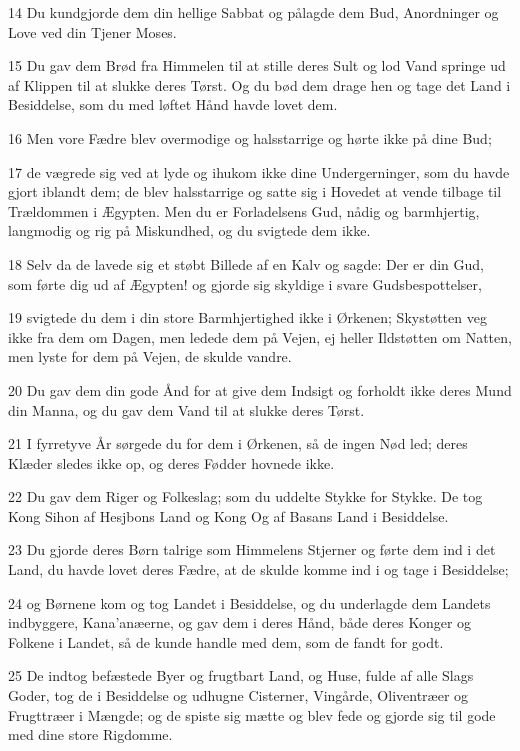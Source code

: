 \par 14 Du kundgjorde dem din hellige Sabbat og pålagde dem Bud, Anordninger og Love ved din Tjener Moses.
\par 15 Du gav dem Brød fra Himmelen til at stille deres Sult og lod Vand springe ud af Klippen til at slukke deres Tørst. Og du bød dem drage hen og tage det Land i Besiddelse, som du med løftet Hånd havde lovet dem.
\par 16 Men vore Fædre blev overmodige og halsstarrige og hørte ikke på dine Bud;
\par 17 de vægrede sig ved at lyde og ihukom ikke dine Undergerninger, som du havde gjort iblandt dem; de blev halsstarrige og satte sig i Hovedet at vende tilbage til Trældommen i Ægypten. Men du er Forladelsens Gud, nådig og barmhjertig, langmodig og rig på Miskundhed, og du svigtede dem ikke.
\par 18 Selv da de lavede sig et støbt Billede af en Kalv og sagde: Der er din Gud, som førte dig ud af Ægypten! og gjorde sig skyldige i svare Gudsbespottelser,
\par 19 svigtede du dem i din store Barmhjertighed ikke i Ørkenen; Skystøtten veg ikke fra dem om Dagen, men ledede dem på Vejen, ej heller Ildstøtten om Natten, men lyste for dem på Vejen, de skulde vandre.
\par 20 Du gav dem din gode Ånd for at give dem Indsigt og forholdt ikke deres Mund din Manna, og du gav dem Vand til at slukke deres Tørst.
\par 21 I fyrretyve År sørgede du for dem i Ørkenen, så de ingen Nød led; deres Klæder sledes ikke op, og deres Fødder hovnede ikke.
\par 22 Du gav dem Riger og Folkeslag; som du uddelte Stykke for Stykke. De tog Kong Sihon af Hesjbons Land og Kong Og af Basans Land i Besiddelse.
\par 23 Du gjorde deres Børn talrige som Himmelens Stjerner og førte dem ind i det Land, du havde lovet deres Fædre, at de skulde komme ind i og tage i Besiddelse;
\par 24 og Børnene kom og tog Landet i Besiddelse, og du underlagde dem Landets indbyggere, Kana'anæerne, og gav dem i deres Hånd, både deres Konger og Folkene i Landet, så de kunde handle med dem, som de fandt for godt.
\par 25 De indtog befæstede Byer og frugtbart Land, og Huse, fulde af alle Slags Goder, tog de i Besiddelse og udhugne Cisterner, Vingårde, Oliventræer og Frugttræer i Mængde; og de spiste sig mætte og blev fede og gjorde sig til gode med dine store Rigdomme.
